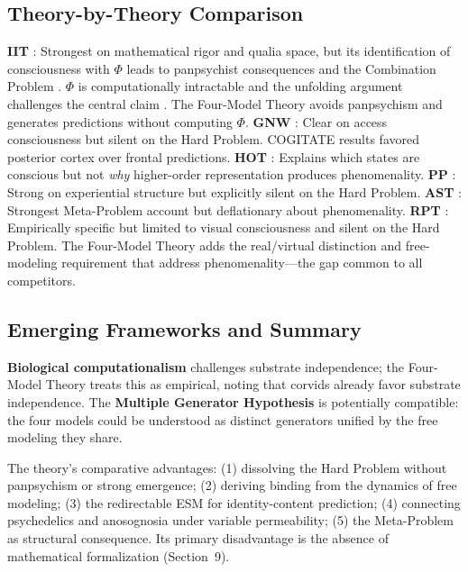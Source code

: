 \documentclass[12pt]{article}
\begin{document}
\subsection{Theory-by-Theory Comparison}

\textbf{IIT} \citep{Tononi2004,Albantakis2023}: Strongest on mathematical rigor and qualia space, but its identification of consciousness with $\Phi$ leads to panpsychist consequences and the Combination Problem \citep{Chalmers2016}. $\Phi$ is computationally intractable \citep{Aaronson2014} and the unfolding argument challenges the central claim \citep{Doerig2019}. The Four-Model Theory avoids panpsychism and generates predictions without computing $\Phi$. \textbf{GNW} \citep{Baars1988,Dehaene2011}: Clear on access consciousness but silent on the Hard Problem. COGITATE results \citeyearpar{COGITATE2025} favored posterior cortex over frontal predictions. \textbf{HOT} \citep{Rosenthal2005,Lau2011}: Explains which states are conscious but not \emph{why} higher-order representation produces phenomenality. \textbf{PP} \citep{Seth2021}: Strong on experiential structure but explicitly silent on the Hard Problem. \textbf{AST} \citep{Graziano2013}: Strongest Meta-Problem account but deflationary about phenomenality. \textbf{RPT} \citep{Lamme2006,Lamme2010}: Empirically specific but limited to visual consciousness and silent on the Hard Problem. The Four-Model Theory adds the real/virtual distinction and free-modeling requirement that address phenomenality---\hspace{0pt}the gap common to all competitors.


\subsection{Emerging Frameworks and Summary}

\textbf{Biological computationalism} \citep{Milinkovic2025} challenges substrate independence; the Four-Model Theory treats this as empirical, noting that corvids already favor substrate independence. The \textbf{Multiple Generator Hypothesis} \citep{KirkebyHinrup2025} is potentially compatible: the four models could be understood as distinct generators unified by the free modeling they share.

The theory's comparative advantages: (1) dissolving the Hard Problem without panpsychism or strong emergence; (2) deriving binding from the dynamics of free modeling; (3) the redirectable ESM for identity-content prediction; (4) connecting psychedelics and anosognosia under variable permeability; (5) the Meta-Problem as structural consequence. Its primary disadvantage is the absence of mathematical formalization (Section~9).
\end{document}
